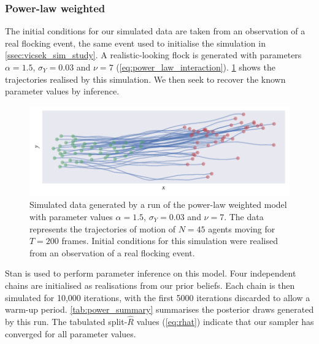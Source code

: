 \subsubsection{Power-law weighted}
\label{sssec:power_law_sim_study}

The initial conditions for our simulated data are taken from an observation of
a real flocking event, the same event used to initialise the simulation in
\cref{ssec:vicsek_sim_study}. A realistic-looking flock is generated with
parameters $\alpha=1.5$, $\sigma_Y=0.03$ and $\nu=7$
(\cref{eq:power_law_interaction}). \cref{fig:power_sim} shows the trajectories
realised by this simulation. We then seek to recover the known parameter values
by inference.
\begin{figure}[tbp]
  \includegraphics{power/power_sim.pdf}
  \caption{Simulated data generated by a run of the power-law weighted model
    with parameter values $\alpha=1.5$, $\sigma_Y=0.03$ and $\nu=7$. The data
    represents the trajectories of motion of $N=45$ agents moving for $T=200$
    frames. Initial conditions for this simulation were realised from an
    observation of a real flocking event.}
  \label{fig:power_sim}
\end{figure}

Stan is used to perform parameter inference on this model. Four independent
chains are initialised as realisations from our prior beliefs. Each chain is
then simulated for 10,000 iterations, with the first 5000 iterations discarded
to allow a warm-up period. \cref{tab:power_summary} summarises the posterior
draws generated by this run. The tabulated split-$\widehat{R}$ values
(\cref{eq:rhat}) indicate that our sampler has converged for all parameter
values.

